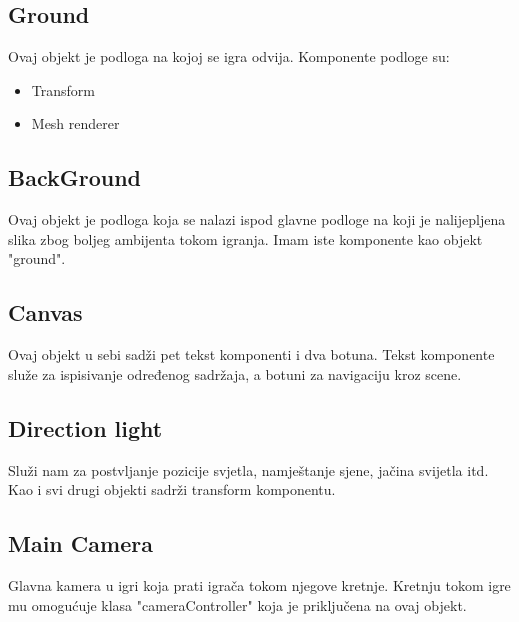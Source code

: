 \subsection{Ground}
Ovaj objekt je podloga na kojoj se igra odvija. Komponente podloge su:

\begin{itemize}
\item Transform

\item Mesh renderer

\end{itemize}
\subsection{BackGround}
Ovaj objekt je podloga koja se nalazi ispod glavne podloge na koji je nalijepljena slika zbog boljeg ambijenta tokom igranja.
Imam iste komponente kao objekt "ground".

\subsection{Canvas}
Ovaj objekt u sebi sadži pet tekst komponenti i dva botuna. Tekst komponente služe za ispisivanje određenog sadržaja, a botuni za navigaciju kroz scene.

\subsection{Direction light}
Služi nam za postvljanje pozicije svjetla, namještanje sjene, jačina svijetla itd. Kao i svi drugi objekti sadrži transform komponentu.

\subsection{Main Camera}
Glavna kamera u igri koja prati igrača tokom njegove kretnje. Kretnju tokom igre mu omogućuje klasa "cameraController" koja je priključena na ovaj objekt.

